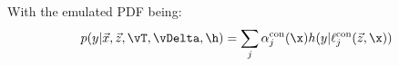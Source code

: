         With the emulated PDF being:
        \begin{equation}
             p(y | \vec{x},\vec{z},\vT,\vDelta,\h) =\sum_j \alpha^\text{con}_j(\x) h(y| \ell_j^\text{con}(\vec{z},\x))
        \end{equation}





